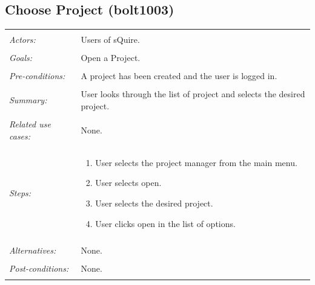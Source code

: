 \documentclass[11pt]{report}
\begin{document}
\begin{IDE-like Features}
\begin{}
\begin{Collaborative features that would be "nice":}
\subsection{Choose Project (bolt1003)}
\begin{tabular}{ p{2cm} p{12cm} }
 \hline
 \\
 \textit{Actors:} & Users of sQuire. \\ 
 \\
 \textit{Goals:} & Open a Project. \\
 \\
 \textit{Pre-conditions:} & A project has been created and the user is logged in. \\
 \\
 \textit{Summary:} & User looks through the list of project and selects the desired project. \\ 
 \\
 \textit{Related use cases:} & None. \\ 
 \\
 \textit{Steps:} & \begin{enumerate}
  \item User selects the project manager from the main menu.
  \item User selects open.
  \item User selects the desired project.
  \item User clicks open in the list of options.
 \end{enumerate} \\
 \\
 \textit{Alternatives:} & None. \\
 \\
 \textit{Post-conditions:} & None. \\
 \\
\hline
\end{tabular}


\end{Collaborative features that would be "nice":}
\end{}
\end{IDE-like Features}
\end{document}
